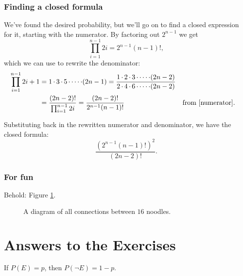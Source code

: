 \documentclass{book}
\begin{document}
\subsection*{Finding a closed formula}
We've found the desired probability, but we'll go on to find a closed expression for it, starting with the numerator. By factoring out $2^{n-1}$ we get
\begin{equation}\label{numerator}
\prod_{i=1}^{n-1}2i = 2^{n-1}(n-1)!,
\end{equation}
which we can use to rewrite the denominator:
\begin{align*}
  \prod_{i=1}^{n-1}2i+1 
  &= 1\cdot3\cdot5\cdot\cdots\cdot(2n-1)
  = \frac{1\cdot2\cdot3\cdot\cdots\cdot(2n-2)}{2\cdot4\cdot6\cdot\cdots\cdot(2n-2)}\\
  &= \frac{(2n-2)!}{\prod_{i=1}^{n-1}2i}
  = \frac{(2n-2)!}{2^{n-1}(n-1)!} && \text{from \eqref{numerator}.}
\end{align*}

Substituting back in the rewritten numerator and denominator, we have the closed formula:
\[
\frac{(2^{n-1}(n-1)!)^2}{(2n-2)!}.
\]

\newpage
\subsection*{For fun}
Behold: Figure \ref{big}.
\begin{figure}[H]
  \centering
  \caption{A diagram of all connections between $16$ noodles.}\label{big}
  \end{figure}
\allowdisplaybreaks

\appendix

\chapter{Answers to the Exercises}\label{answers}

\renewcommand{\thechapter}{\arabic{chapter}}

\begin{answer}
If $P(E) = p$, then $P(\neg E) = 1 - p$.
\end{answer}


\end{document}
